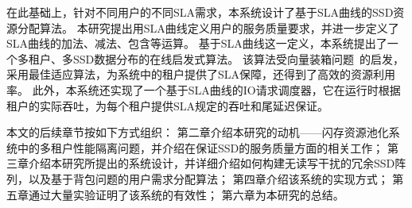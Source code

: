 在此基础上，针对不同用户的不同SLA需求，本系统设计了基于SLA曲线的SSD资源分配算法。
本研究提出用SLA曲线定义用户的服务质量要求，并进一步定义了SLA曲线的加法、减法、包含等运算。
基于SLA曲线这一定义，本系统提出了一个多租户、多SSD数据分布的在线启发式算法。
该算法受向量装箱问题~\cite{panigrahy2011heuristics,hu2003operations}的启发，采用最佳适应算法，为系统中的租户提供了SLA保障，还得到了高效的资源利用率。
此外，本系统还实现了一个基于SLA曲线的IO请求调度器，它在运行时根据租户的实际吞吐，为每个租户提供SLA规定的吞吐和尾延迟保证。

本文的后续章节按如下方式组织：
第二章介绍本研究的动机——闪存资源池化系统中的多租户性能隔离问题，并介绍在保证SSD的服务质量方面的相关工作；
第三章介绍本研究所提出的系统设计，并详细介绍如何构建无读写干扰的冗余SSD阵列，以及基于背包问题的用户需求分配算法；
第四章介绍该系统的实现方式；
第五章通过大量实验证明了该系统的有效性；
第六章为本研究的总结。